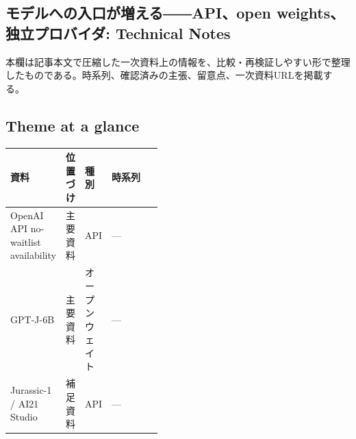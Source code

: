 \subsection*{モデルへの入口が増える――API、open weights、独立プロバイダ: Technical Notes}
本欄は記事本文で圧縮した一次資料上の情報を、比較・再検証しやすい形で整理したものである。時系列、確認済みの主張、留意点、一次資料URLを掲載する。
\medskip
\subsection*{Theme at a glance}
\begin{center}
\footnotesize
\begin{tabularx}{\linewidth}{@{}p{0.20\linewidth}p{0.10\linewidth}p{0.14\linewidth}X@{}}
\toprule
資料 & 位置づけ & 種別 & 時系列 \\
\midrule
OpenAI API no-waitlist availability & 主要資料 & API & — \\
GPT-J-6B & 主要資料 & オープンウェイト & — \\
Jurassic-1 / AI21 Studio & 補足資料 & API & — \\
\bottomrule
\end{tabularx}
\end{center}
\normalsize


